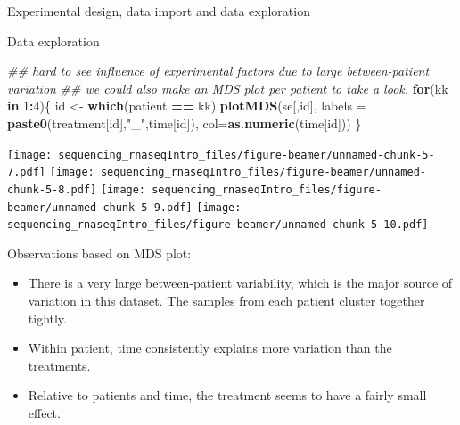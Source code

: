 \documentclass[ignorenonframetext,]{beamer}
\newenvironment{Shaded}{\begin{snugshade}}{\end{snugshade}}
\newcommand{\CommentTok}[1]{\textcolor[rgb]{0.56,0.35,0.01}{\textit{#1}}}
\newcommand{\ControlFlowTok}[1]{\textcolor[rgb]{0.13,0.29,0.53}{\textbf{#1}}}
\newcommand{\DataTypeTok}[1]{\textcolor[rgb]{0.13,0.29,0.53}{#1}}
\newcommand{\DecValTok}[1]{\textcolor[rgb]{0.00,0.00,0.81}{#1}}
\newcommand{\KeywordTok}[1]{\textcolor[rgb]{0.13,0.29,0.53}{\textbf{#1}}}
\newcommand{\NormalTok}[1]{#1}
\newcommand{\OperatorTok}[1]{\textcolor[rgb]{0.81,0.36,0.00}{\textbf{#1}}}
\newcommand{\StringTok}[1]{\textcolor[rgb]{0.31,0.60,0.02}{#1}}
\providecommand{\tightlist}{%
  \setlength{\itemsep}{0pt}\setlength{\parskip}{0pt}}
\begin{document}
\begin{frame}[fragile]{Experimental design, data import and data
exploration}
\begin{block}{Data exploration}
\begin{Shaded}
\begin{Highlighting}[]
\CommentTok{## hard to see influence of experimental factors due to large between-patient variation}
\CommentTok{## we could also make an MDS plot per patient to take a look.}
\ControlFlowTok{for}\NormalTok{(kk }\ControlFlowTok{in} \DecValTok{1}\OperatorTok{:}\DecValTok{4}\NormalTok{)\{}
\NormalTok{  id <-}\StringTok{ }\KeywordTok{which}\NormalTok{(patient }\OperatorTok{==}\StringTok{ }\NormalTok{kk)}
  \KeywordTok{plotMDS}\NormalTok{(se[,id], }
        \DataTypeTok{labels =} \KeywordTok{paste0}\NormalTok{(treatment[id],}\StringTok{"_"}\NormalTok{,time[id]), }
        \DataTypeTok{col=}\KeywordTok{as.numeric}\NormalTok{(time[id]))}
\NormalTok{\}}
\end{Highlighting}
\end{Shaded}

\texttt{[image: sequencing\_rnaseqIntro\_files/figure-beamer/unnamed-chunk-5-7.pdf]}
\texttt{[image: sequencing\_rnaseqIntro\_files/figure-beamer/unnamed-chunk-5-8.pdf]}
\texttt{[image: sequencing\_rnaseqIntro\_files/figure-beamer/unnamed-chunk-5-9.pdf]}
\texttt{[image: sequencing\_rnaseqIntro\_files/figure-beamer/unnamed-chunk-5-10.pdf]}

Observations based on MDS plot:

\begin{itemize}
\tightlist
\item
  There is a very large between-patient variability, which is the major
  source of variation in this dataset. The samples from each patient
  cluster together tightly.
\item
  Within patient, time consistently explains more variation than the
  treatments.
\item
  Relative to patients and time, the treatment seems to have a fairly
  small effect.
\end{itemize}

\end{block}

\end{frame}
\end{document}
